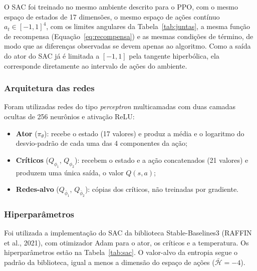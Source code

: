 O SAC foi treinado no mesmo ambiente descrito para o PPO, com o mesmo espaço de estados de 17 dimensões, o mesmo espaço de ações contínuo $a_t \in [-1, 1]^4$, com os limites angulares da Tabela~\ref{tab:juntas}, a mesma função de recompensa (Equação~\ref{eq:recompensa}) e as mesmas condições de término, de modo que as diferenças observadas se devem apenas ao algoritmo. Como a saída do ator do SAC já é limitada a $[-1, 1]$ pela tangente hiperbólica, ela corresponde diretamente ao intervalo de ações do ambiente.

\subsubsection{Arquitetura das redes}

Foram utilizadas redes do tipo \textit{perceptron} multicamadas com duas camadas ocultas de 256 neurônios e ativação ReLU:

\begin{itemize}
    \item \textbf{Ator} ($\pi_\theta$): recebe o estado (17 valores) e produz a média e o logaritmo do desvio-padrão de cada uma das 4 componentes da ação;
    \item \textbf{Críticos} ($Q_{\phi_1}$, $Q_{\phi_2}$): recebem o estado e a ação concatenados (21 valores) e produzem uma única saída, o valor $Q(s, a)$;
    \item \textbf{Redes-alvo} ($Q_{\bar{\phi}_1}$, $Q_{\bar{\phi}_2}$): cópias dos críticos, não treinadas por gradiente.
\end{itemize}

\subsubsection{Hiperparâmetros}

Foi utilizada a implementação do SAC da biblioteca Stable-Baselines3 (RAFFIN et al., 2021), com otimizador Adam para o ator, os críticos e a temperatura. Os hiperparâmetros estão na Tabela~\ref{tab:sac}. O valor-alvo da entropia segue o padrão da biblioteca, igual a menos a dimensão do espaço de ações ($\bar{\mathcal{H}} = -4$).

